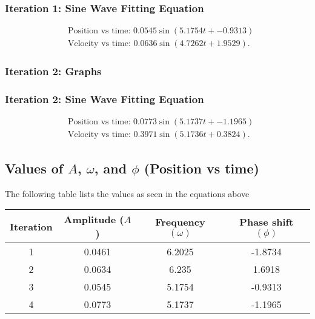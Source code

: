 \documentclass{report}
\begin{document}
    \bigbreak \noindent 
\subsubsection{Iteration 1: Sine Wave Fitting Equation}
\begin{align*}
        &\text{Position vs time: } 0.0545\sin{(5.1754t + -0.9313)} \\
        &\text{Velocity vs time: } 0.0636\sin{(4.7262t + 1.9529)}
    .\end{align*}

    \bigbreak \noindent 
    \subsubsection{Iteration 2: Graphs} 

    \bigbreak \noindent 
\subsubsection{Iteration 2: Sine Wave Fitting Equation}
\begin{align*}
        &\text{Position vs time: } 0.0773\sin{(5.1737t + -1.1965)} \\
        &\text{Velocity vs time: } 0.3971\sin{(5.1736t + 0.3824)}
    .\end{align*}

    \pagebreak 
    \subsection{Values of $A$, $\omega$, and $\phi$ (Position vs time)}
    \bigbreak \noindent 
    The following table lists the values as seen in the equations above
    \begin{center}
        \begin{tabular}{c|c|c|c}
            Iteration & Amplitude ($A$) & Frequency $(\omega)$ & Phase shift $(\phi)$ \\ 
            \hline
            1 & 0.0461 & 6.2025 & -1.8734 \\ 
            2 & 0.0634 & 6.235 & 1.6918 \\
            3 &0.0545 & 5.1754 & -0.9313\\
            4&0.0773 & 5.1737 & -1.1965 \\
        \end{tabular}
    \end{center}
\end{document}
